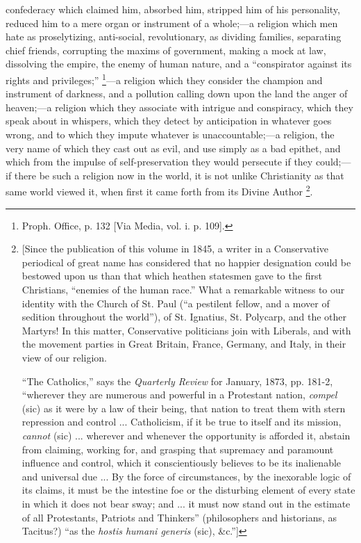 confederacy which claimed him, absorbed him, stripped him
of his personality, reduced him to a mere organ or
instrument of a whole;—a religion which men hate as
proselytizing, anti-social, revolutionary, as dividing
families, separating chief friends, corrupting the maxims
of government, making a mock at law, dissolving the
empire, the enemy of human nature, and a
``conspirator against its rights and
privileges;'' \footnote{Proph.
Office, p. 132 [Via
Media, vol. i. p. 109].}—a religion which they
consider the champion and instrument of darkness, and a
pollution calling down upon the land the anger of
heaven;—a religion which they associate with
intrigue and conspiracy, which they speak about in
whispers, which they detect by anticipation in whatever
goes wrong, and to which they impute whatever is
unaccountable;—a religion, the very name of which
they cast out as evil, and use simply as a bad epithet,
and which from the impulse of self-preservation they
would persecute if they could;—if there be such a
religion now in the world, it is not unlike Christianity
as that same world viewed it, when first it came forth
from its Divine Author \footnote{[Since the publication of
this volume in 1845, a writer in a Conservative
periodical of great name has considered that no happier
designation could be bestowed upon us than that which
heathen statesmen gave to the first Christians,
``enemies of the human race.'' What a remarkable
witness to our identity with the Church of St. Paul
(``a pestilent fellow, and a mover of sedition
throughout the world''), of St. Ignatius, St.
Polycarp, and the other Martyrs! In this matter,
Conservative politicians join with Liberals, and with the
movement parties in Great Britain, France, Germany, and
Italy, in their view of our religion.

``The Catholics,'' says the \emph{Quarterly
Review} for January, 1873, pp. 181-2, ``wherever
they are numerous and powerful in a Protestant nation, \emph{compel}
(sic) as it were by a law of their being, that nation to
treat them with stern repression and control ...
Catholicism, if it be true to itself and its mission, \emph{cannot}
(sic) ... wherever and whenever the opportunity is
afforded it, abstain from claiming, working for, and
grasping that supremacy and paramount influence and
control, which it conscientiously believes to be its
inalienable and universal due ... By the force of
circumstances, by the inexorable logic of its claims, it
must be the intestine foe or the disturbing element of
every state in which it does not bear sway; and ... it
must now stand out in the estimate of all Protestants,
Patriots and Thinkers'' (philosophers and historians,
as Tacitus?) ``as the \emph{hostis humani generis}
(sic), \&c.'']}.

